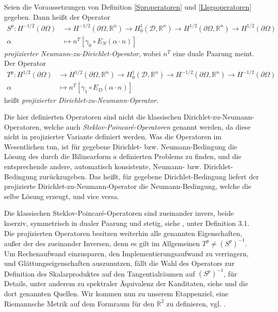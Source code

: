 \begin{defi}\label{Randoperatoren}
Seien die Voraussetzungen von Definition \ref{Sproperatoren} und \ref{Llsgsoperatoren} gegeben. Dann heißt der Operator
\begin{align*}
	S^p: H^{-1/2}(\partial\Omega) &\rightarrow H^{-1/2}(\partial\Omega, \mathbb{R}^n) \rightarrow H^1_0(\mathcal{D},\mathbb{R}^n) \rightarrow H^{1/2}(\partial\Omega, \mathbb{R}^n) \rightarrow H^{1/2}(\partial\Omega) \\
	\alpha &\mapsto n^T[\gamma_0 \circ E_N(\alpha \cdot n)]
\end{align*}
\textit{projizierter Neumann-zu-Dirichlet-Operator}, wobei $n^T$ eine duale Paarung meint.
Der Operator
\begin{align*}
	T^p: H^{1/2}(\partial\Omega) &\rightarrow H^{1/2}(\partial\Omega,\mathbb{R}^n) \rightarrow H^1_0(\mathcal{D},\mathbb{R}^n) \rightarrow H^{-1/2}(\partial\Omega,\mathbb{R}^n) \rightarrow H^{-1/2}(\partial\Omega) \\
	\alpha &\mapsto n^T[\gamma_1 \circ E_D(\alpha \cdot n)]
\end{align*}
heißt \textit{projizierter Dirichlet-zu-Neumann-Operator}.
\end{defi}

Die hier definierten Operatoren sind nicht die klassischen Dirichlet-zu-Neumann-Operatoren, welche auch \textit{Steklov-Poincaré-Operatoren} genannt werden, da diese nicht in projizierter Variante definiert werden. Was die Operatoren im Wesentlichen tun, ist für gegebene Dirichlet- bzw. Neumann-Bedingung die Lösung des durch die Bilinearform $a$ definierten Problems zu finden, und die entsprechende andere, automatisch konsistente, Neumann- bzw. Dirichlet-Bedingung zurückzugeben. Das heißt, für gegebene Dirichlet-Bedingung liefert der projizierte Dirichlet-zu-Neumann-Operator die Neumann-Bedingung, welche die selbe Lösung erzeugt, und vice versa.

Die klassischen Steklov-Poincaré-Operatoren sind zueinander invers, beide koerziv, symmetrisch in dualer Paarung und stetig, siehe \cite{bfgs2}, unter Definition 3.1. Die projizierten Operatoren besitzen weiterhin alle genannten Eigenschaften, außer der des zueinander Inversen, denn es gilt im Allgemeinen $T^p \neq (S^p)^{-1}$. Um Rechenaufwand einzusparen, den Implementierungsaufwand zu verringern, und Glättungseigenschaften auszunutzen, fällt die Wahl des Operators zur Definition des Skalarproduktes auf den Tangentialräumen auf $(S^p)^{-1}$, für Details, unter anderem zu spektraler Äquivalenz der Kanditaten, siehe \cite{bfgs2} und die dort genannten Quellen. Wir kommen nun zu unserem Etappenziel, eine Riemannsche Metrik auf dem Formraum für den $\mathbb{R}^2$ zu definieren, vgl. \cite{bfgs2}.

